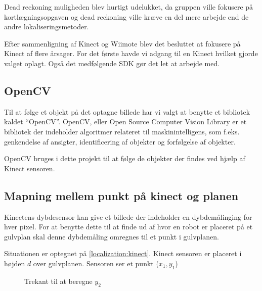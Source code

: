 Dead reckoning muligheden blev hurtigt udelukket, da gruppen ville fokusere på kortlægningsopgaven og dead reckoning ville kræve en del mere arbejde end de andre lokaliseringsmetoder.

Efter sammenligning af Kinect og Wiimote blev det besluttet at fokusere på Kinect af flere årsager.
For det første havde vi adgang til en Kinect hvilket gjorde valget oplagt. 
Også det medfølgende SDK gør det let at arbejde med.

\subsection{OpenCV}
Til at følge et objekt på det optagne billede har vi valgt at benytte et bibliotek kaldet ``OpenCV''.
OpenCV, eller Open Source Computer Vision Library er et bibliotek der indeholder algoritmer relateret til maskinintelligens, som f.eks. genkendelse af ansigter, identificering af objekter og forfølgelse af objekter.\cite{opencv}

OpenCV bruges i dette projekt til at følge de objekter der findes ved hjælp af Kinect sensoren.

\clearpage
\subsection{Mapning mellem punkt på kinect og planen}

Kinectens dybdesensor kan give et billede der indeholder en dybdemålinging for hver pixel. 
For at benytte dette til at finde ud af hvor en robot er placeret på et gulvplan skal denne dybdemåling omregnes til et punkt i gulvplanen.

Situationen er optegnet på \cref{localization:kinect}.
Kinect sensoren er placeret i højden $ d $ over gulvplanen. 
Sensoren ser et punkt ($ x_1,y_1 $)

\begin{figure}
\centering
{}
\caption{Trekant til at beregne $ y_2 $}
\label{localization:trekant}
\end{figure}

